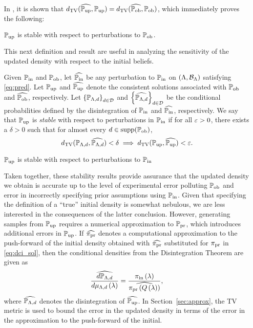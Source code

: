 In \cite{BJW18}, it is shown that $d_{\text{TV}} (\widehat{\operatorname*{\mathbb{P}_{up}}}, \operatorname*{\mathbb{P}_{up}}) = d_{\text{TV}} (\widehat{\operatorname*{\mathbb{P}_{ob}}}, \operatorname*{\mathbb{P}_{ob}})$, which immediately proves the following:

\begin{thm}
  $\operatorname*{\mathbb{P}_{up}}$ is stable with respect to perturbations to $\operatorname*{\mathbb{P}_{ob}}$.
  \label{thm:stableobs}
\end{thm}

This next definition and result are useful in analyzing the sensitivity of the updated density with respect to the initial beliefs.

\begin{defn}\label{defn:stableinitial}
  Given $\operatorname*{\mathbb{P}_{in}}$ and $\operatorname*{\mathbb{P}_{ob}}$, let $\widehat{\operatorname*{\mathbb{P}_{in}}}$ be any perturbation to $\operatorname*{\mathbb{P}_{in}}$ on $({\Lambda}, \mathcal{B}_{{\Lambda}})$ satisfying \eqref{eq:pred}.
  Let $\operatorname*{\mathbb{P}_{up}}$ and $\widehat{\operatorname*{\mathbb{P}_{up}}}$ denote the consistent solutions associated with $\operatorname*{\mathbb{P}_{ob}}$ and $\widehat{\operatorname*{\mathbb{P}_{ob}}}$, respectively.
  Let $\left\{\mathbb{P}_{{\Lambda}, d}\right\}_{d\in\mathcal{D}}^{}$ and $\left\{\widehat{\mathbb{P}_{{\Lambda}, d}}\right\}_{d\in\mathcal{D}}^{}$ be the conditional probabilities defined by the disintegration of $\operatorname*{\mathbb{P}_{in}}$ and $\widehat{\operatorname*{\mathbb{P}_{in}}}$, respectively.
  We say that $\operatorname*{\mathbb{P}_{up}}$ is \emph{stable} with respect to perturbations in $\operatorname*{\mathbb{P}_{in}}$ if for all $\varepsilon > 0$, there exists a $\delta > 0$ such that for almost every $d\in\text{supp}(\operatorname*{\mathbb{P}_{ob}})$,
  \begin{equation}\label{eq:stableinitial}
    d_{\text{TV}} (\mathbb{P}_{{\Lambda}, d}, \widehat{\mathbb{P}_{{\Lambda}, d}}) < \delta \implies d_{\text{TV}} (\operatorname*{\mathbb{P}_{up}}, \widehat{\operatorname*{\mathbb{P}_{up}}}) < \varepsilon.
  \end{equation}
\end{defn}

\begin{thm}
  $\operatorname*{\mathbb{P}_{up}}$ is stable with respect to perturbations to $\operatorname*{\mathbb{P}_{in}}$
  \label{thm:stableinitial}
\end{thm}

Taken together, these stability results provide assurance that the updated density we obtain is accurate up to the level of experimental error polluting $\operatorname*{\mathbb{P}_{ob}}$ and error in incorrectly specifying prior assumptions using $\operatorname*{\mathbb{P}_{in}}$.
Given that specifying the definition of a ``true'' initial density is somewhat nebulous, we are less interested in the consequences of the latter conclusion.
However, generating samples from $\operatorname*{\mathbb{P}_{up}}$ requires a numerical approximation to $\operatorname*{\mathbb{P}_{pr}}$, which introduces additional errors in $\operatorname*{\mathbb{P}_{up}}$.
If $\widehat{\operatorname*{\pi_{pr}}}$ denotes a computational approximation to the push-forward of the initial density obtained with $\widehat{\operatorname*{\pi_{pr}}}$ substituted for $\operatorname*{\pi_{pr}}$ in \eqref{eq:dci_sol}, then the conditional densities from the Disintegration Theorem are given as
\[
\frac{\widehat{d\mathbb{P}_{{\Lambda}, d}}}{d\mu_{{\Lambda}, d}\left ( \lambda \right )} = \frac{\operatorname*{\pi_{in}}\left ( \lambda \right )}{ \widehat{\operatorname*{\pi_{pr}}\left ( Q\left ( \lambda \right ) \right )} },
\]
where $\widehat{\mathbb{P}_{{\Lambda}, d}}$ denotes the disintegration of $\widehat{\operatorname*{\mathbb{P}_{up}}}$.
In Section~\ref{sec:approx}, the TV metric is used to bound the error in the updated density in terms of the error in the approximation to the push-forward of the initial.



